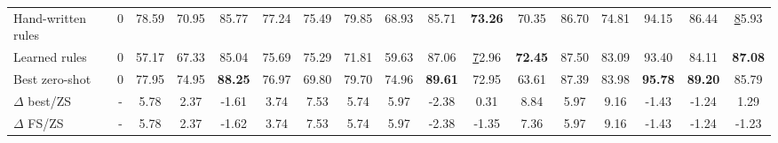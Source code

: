\documentclass[sigconf,nonacm]{acmart}
\begin{document}
\begin{table*}[]
{\begin{tabular}{@{}l|c|ccccc|ccccc|ccccc@{}}
Hand-written rules                   & 0     & 78.59                       & 70.95                        & 85.77                        & 77.24                       & 75.49                       & 79.85                       & 68.93                        & 85.71                        & \textbf{73.26}               & 70.35                       & 86.70                       & 74.81                        & 94.15                        & 86.44                        & {\ul 85.93}                  \\
Learned rules                        & 0     & 57.17                       & 67.33                        & 85.04                        & 75.69                       & 75.29                       & 71.81                       & 59.63                        & 87.06                        & {\ul 72.96}                  & \textbf{72.45}              & 87.50                       & 83.09                        & 93.40                        & 84.11                        & \textbf{87.08}               \\ \midrule
Best zero-shot                       & 0     & 77.95                       & 74.95                        & \textbf{88.25}               & 76.97                       & 69.80                       & 79.70                       & 74.96                        & \textbf{89.61}               & 72.95                        & 63.61                       & 87.39                       & 83.98                        & \textbf{95.78}               & \textbf{89.20}               & 85.79                        \\ \midrule
$\Delta$ best/ZS                        & -     & {\color[HTML]{6434FC} 5.78} & {\color[HTML]{6434FC} 2.37}  & {\color[HTML]{FE0000} -1.61} & {\color[HTML]{6434FC} 3.74} & {\color[HTML]{6434FC} 7.53} & {\color[HTML]{6434FC} 5.74} & {\color[HTML]{6434FC} 5.97}  & {\color[HTML]{FE0000} -2.38} & {\color[HTML]{6434FC} 0.31}  & {\color[HTML]{6434FC} 8.84} & {\color[HTML]{6434FC} 5.97} & {\color[HTML]{6434FC} 9.16}  & {\color[HTML]{FE0000} -1.43} & {\color[HTML]{FE0000} -1.24} & {\color[HTML]{6434FC} 1.29}  \\
$\Delta$ FS/ZS                          & -     & {\color[HTML]{6434FC} 5.78} & {\color[HTML]{6434FC} 2.37}  & {\color[HTML]{FE0000} -1.62} & {\color[HTML]{6434FC} 3.74} & {\color[HTML]{6434FC} 7.53} & {\color[HTML]{6434FC} 5.74} & {\color[HTML]{6434FC} 5.97}  & {\color[HTML]{FE0000} -2.38} & {\color[HTML]{FE0000} -1.35} & {\color[HTML]{6434FC} 7.36} & {\color[HTML]{6434FC} 5.97} & {\color[HTML]{6434FC} 9.16}  & {\color[HTML]{FE0000} -1.43} & {\color[HTML]{FE0000} -1.24} & {\color[HTML]{FE0000} -1.23} \\

\end{tabular}}
\end{table*}
\end{document}
